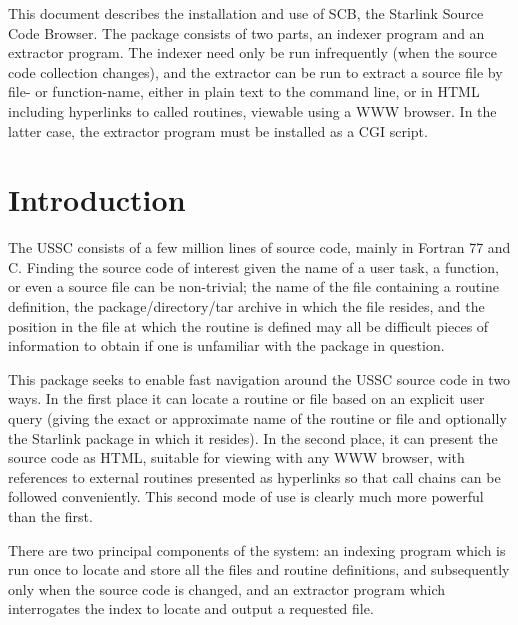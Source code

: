\documentclass[twoside,11pt]{article}
\newcommand{\stardocinitials}  {SUN}
\newcommand{\stardocnumber}    {226.1(Draft)}
\newcommand{\stardocabstract}  {
This document describes the installation and use of SCB, 
the Starlink Source Code Browser.  
The package consists of two parts, an indexer program and an
extractor program.
The indexer need only be run infrequently (when the source code collection
changes), and the extractor can be run to extract a source file
by file- or function-name, either in plain text to the command line,
or in HTML including hyperlinks to called routines, viewable
using a WWW browser.  In the latter case, the extractor program 
must be installed as a CGI script.
}
\newcommand{\stardocname}{\stardocinitials /\stardocnumber}
\newenvironment{latexonly}{}{}
\newcommand{\xlabel}[1]{}
\renewcommand{\_}{\texttt{\symbol{95}}}
\renewcommand{\thepage}{\roman{page}}
\begin{document}
\stardocabstract
  \newpage
  \begin{latexonly}
    \setlength{\parskip}{0mm}
    \tableofcontents
    \setlength{\parskip}{\medskipamount}
    \markboth{\stardocname}{\stardocname}
  \end{latexonly}
\cleardoublepage
\renewcommand{\thepage}{\arabic{page}}
\setcounter{page}{1}


\section{\xlabel{sec:introduction}\label{sec:introduction}Introduction}

The USSC consists of a few million lines of source code, mainly in 
Fortran 77 and C. 
Finding the source code of interest given the name of a
user task, a function, or even a source file can be non-trivial;
the name of the file containing a routine definition,
the package/directory/tar archive in which the file resides,
and the position in the file at which the routine is defined
may all be difficult pieces of information to obtain if one is
unfamiliar with the package in question.

This package seeks to enable fast navigation around the USSC 
source code in two ways.  In the first place it can locate a routine
or file based on an explicit user query (giving the exact or
approximate name of the routine or file and optionally the Starlink 
package in which it resides).  In the second place, it can present
the source code as HTML, suitable for viewing with any WWW browser,
with references to external routines presented as hyperlinks so
that call chains can be followed conveniently.
This second mode of use is clearly much more powerful than the first.

There are two principal components of the system: an indexing program
which is run once to locate and store all the files and routine 
definitions, and subsequently only when the source code is changed,
and an extractor program which interrogates the index to locate 
and output a requested file.
\end{document}
